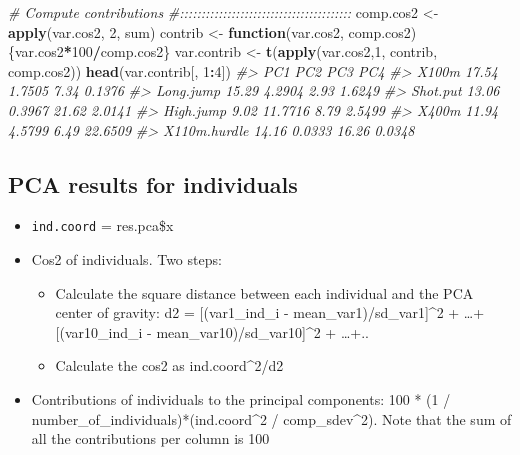 \documentclass[]{book}
\newenvironment{Shaded}{\begin{snugshade}}{\end{snugshade}}
\newcommand{\CommentTok}[1]{\textcolor[rgb]{0.56,0.35,0.01}{\textit{#1}}}
\newcommand{\ControlFlowTok}[1]{\textcolor[rgb]{0.13,0.29,0.53}{\textbf{#1}}}
\newcommand{\DecValTok}[1]{\textcolor[rgb]{0.00,0.00,0.81}{#1}}
\newcommand{\KeywordTok}[1]{\textcolor[rgb]{0.13,0.29,0.53}{\textbf{#1}}}
\newcommand{\NormalTok}[1]{#1}
\newcommand{\OperatorTok}[1]{\textcolor[rgb]{0.81,0.36,0.00}{\textbf{#1}}}
\newcommand{\StringTok}[1]{\textcolor[rgb]{0.31,0.60,0.02}{#1}}
\providecommand{\tightlist}{%
  \setlength{\itemsep}{0pt}\setlength{\parskip}{0pt}}
\begin{document}
\begin{Shaded}
\begin{Highlighting}[]
\CommentTok{# Compute contributions}
\CommentTok{#::::::::::::::::::::::::::::::::::::::::}
\NormalTok{comp.cos2 <-}\StringTok{ }\KeywordTok{apply}\NormalTok{(var.cos2, }\DecValTok{2}\NormalTok{, sum)}
\NormalTok{contrib <-}\StringTok{ }\ControlFlowTok{function}\NormalTok{(var.cos2, comp.cos2)\{var.cos2}\OperatorTok{*}\DecValTok{100}\OperatorTok{/}\NormalTok{comp.cos2\}}
\NormalTok{var.contrib <-}\StringTok{ }\KeywordTok{t}\NormalTok{(}\KeywordTok{apply}\NormalTok{(var.cos2,}\DecValTok{1}\NormalTok{, contrib, comp.cos2))}
\KeywordTok{head}\NormalTok{(var.contrib[, }\DecValTok{1}\OperatorTok{:}\DecValTok{4}\NormalTok{])}
\CommentTok{#>                PC1     PC2   PC3     PC4}
\CommentTok{#> X100m        17.54  1.7505  7.34  0.1376}
\CommentTok{#> Long.jump    15.29  4.2904  2.93  1.6249}
\CommentTok{#> Shot.put     13.06  0.3967 21.62  2.0141}
\CommentTok{#> High.jump     9.02 11.7716  8.79  2.5499}
\CommentTok{#> X400m        11.94  4.5799  6.49 22.6509}
\CommentTok{#> X110m.hurdle 14.16  0.0333 16.26  0.0348}
\end{Highlighting}
\end{Shaded}

\hypertarget{pca-results-for-individuals}{%
\subsection{PCA results for individuals}\label{pca-results-for-individuals}}

\begin{itemize}
\tightlist
\item
  \texttt{ind.coord} = res.pca\$x
\item
  Cos2 of individuals. Two steps:

  \begin{itemize}
  \tightlist
  \item
    Calculate the square distance between each individual and the PCA center of gravity: d2 = {[}(var1\_ind\_i - mean\_var1)/sd\_var1{]}\^{}2 + \ldots{}+ {[}(var10\_ind\_i - mean\_var10)/sd\_var10{]}\^{}2 + \ldots{}+..
  \item
    Calculate the cos2 as ind.coord\^{}2/d2
  \end{itemize}
\item
  Contributions of individuals to the principal components: 100 * (1 / number\_of\_individuals)*(ind.coord\^{}2 / comp\_sdev\^{}2). Note that the sum of all the contributions per column is 100
\end{itemize}
\end{document}
